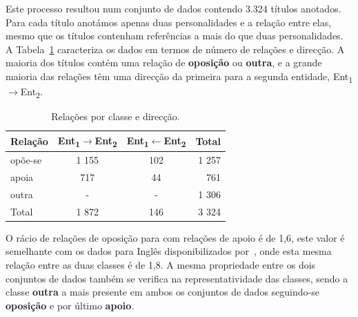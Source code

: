 \documentclass[a4paper, twocolumn, 11pt, twoside]{article}
\begin{document}
Este processo resultou num conjunto de dados contendo 3.324 títulos anotados. Para cada título anotámos apenas duas personalidades e a relação entre elas, mesmo que os títulos contenham referências a mais do que duas personalidades. A Tabela~\ref{tab:rel_dataset} caracteriza os dados em termos de número de relações e direcção. A maioria dos títulos contém uma relação de \textbf{oposição} ou \textbf{outra}, e a grande maioria das relações têm uma direcção da primeira para a segunda entidade, Ent\textsubscript{1}$\rightarrow$Ent\textsubscript{2}.


\begin{table}[!h]
    \begin{center}
    \begin{tabular}{l ccr}
        {\bf Relação} & {\bf \footnotesize{Ent\textsubscript{1}$\rightarrow$Ent\textsubscript{2}}} & {\bf \footnotesize{Ent\textsubscript{1}$\leftarrow$Ent\textsubscript{2}}} & {\bf Total} \\
        \hline
        opõe-se          &  1 155  &  102  &  1 257  \\
        apoia            &    717  &   44  &    761  \\
        outra            &    -    &   -   &  1 306  \\
		\hline
		Total			 &  1 872  &  146  &  3 324  \\
    \end{tabular}
	\caption{Relações por classe e direcção.}
	\label{tab:rel_dataset}
	\end{center}
\end{table}

O rácio de relações de oposição para com relações de apoio é de 1,6, este valor é semelhante com os dados para Inglês disponibilizados por~\cite{park-etal-2021-blames}, onde esta mesma relação entre as duas classes é de 1,8.  A mesma propriedade entre os dois conjuntos de dados também se verifica na representatividade das classes, sendo a classe \textbf{outra} a mais presente em ambos os conjuntos de dados seguindo-se \textbf{oposição} e por último \textbf{apoio}.


\end{document}
